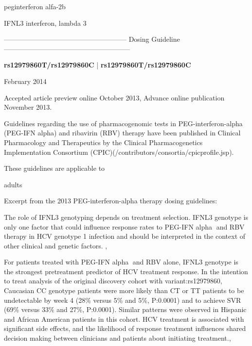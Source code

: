 \documentclass{resume} %
\begin{document}
\begin{rSection}{ peginterferon alfa-2b }
\item[]
\begin{rSubsection}{ IFNL3 }{ interferon, lambda 3 }{}{}
\item[]
\item[] ------------------------------------------------------ Dosing Guideline --------------------------------------------------------\newline
\item[]
\item[] \textbf{ rs12979860T/rs12979860C } | \textbf{ rs12979860T/rs12979860C }
\item February 2014
 \newline
\item Accepted article preview online October 2013,  Advance online publication November 2013.
 \newline
\item Guidelines regarding the use of pharmacogenomic tests in PEG-interferon-alpha (PEG-IFN alpha) and ribavirin (RBV) therapy have been published in Clinical Pharmacology and Therapeutics by the Clinical Pharmacogenetics Implementation Consortium (CPIC)(/contributors/consortia/cpicprofile.jsp).
 \newline
\item These guidelines are applicable to 
 \newline
\item adults
 \newline
\item Excerpt from the 2013 PEG-interferon-alpha therapy dosing guidelines:
 \newline
\item The role of IFNL3 genotyping depends on treatment selection. IFNL3 genotype is only one factor that could influence response rates to PEG-IFN alpha and RBV therapy in HCV genotype 1 infection and should be interpreted in the context of other clinical and genetic factors. , 
 \newline
\item For patients treated with PEG-IFN alpha and RBV alone, IFNL3 genotype is the strongest pretreatment predictor of HCV treatment response. In the intention to treat analysis of the original discovery cohort with variant:rs12979860, Caucasian CC genotype patients were more likely than CT or TT patients to be undetectable by week 4 (28\% versus 5\% and 5\%, P:0.0001) and to achieve SVR (69\% versus 33\% and 27\%, P:0.0001). Similar patterns were observed in Hispanic and African American patients in this cohort. HCV treatment is associated with significant side effects, and the likelihood of response treatment influences shared decision making between clinicians and patients about initiating treatment.,  

\end{rSubsection}
\end{rSection}
\end{document}
